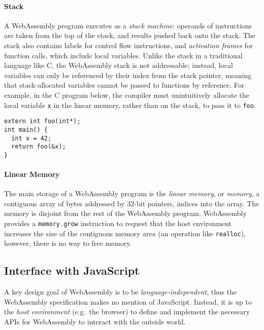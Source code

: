 \paragraph{Stack}

A WebAssembly program executes as a \emph{stack machine}: operands of instructions are taken from the top of the stack, and results pushed back onto the stack. The stack also contains labels for control flow instructions, and \emph{activation frames} for function calls, which include local variables. Unlike the stack in a traditional language like C, the WebAssembly stack is not addressable; instead, local variables can only be referenced by their index from the stack pointer, meaning that stack-allocated variables cannot be passed to functions by reference. For example, in the C program below, the compiler must unintuitively allocate the local variable \texttt{x} in the linear memory, rather than on the stack, to pass it to \texttt{foo}.

\vspace*{-1em}

\begin{center}
\begin{verbatim}
extern int foo(int*);
int main() {
  int x = 42;
  return foo(&x);
}
\end{verbatim}
\end{center}

\vspace*{-2em}

\paragraph{Linear Memory}

The main storage of a WebAssembly program is the \emph{linear memory}, or \emph{memory}, a contiguous array of bytes addressed by 32-bit pointers, indices into the array. The memory is disjoint from the rest of the WebAssembly program. WebAssembly provides a \texttt{memory.grow} instruction to request that the host environment increases the size of the contiguous memory area (an operation like \texttt{realloc}), however, there is no way to free memory.

\subsection{Interface with JavaScript}

\label{sec:wasm-js-interface}

A key design goal of WebAssembly is to be \emph{language-independent}, thus the WebAssembly specification makes no mention of JavaScript. Instead, it is up to the \emph{host environment} (e.g.\ the browser) to define and implement the necessary APIs for WebAssembly to interact with the outside world.

